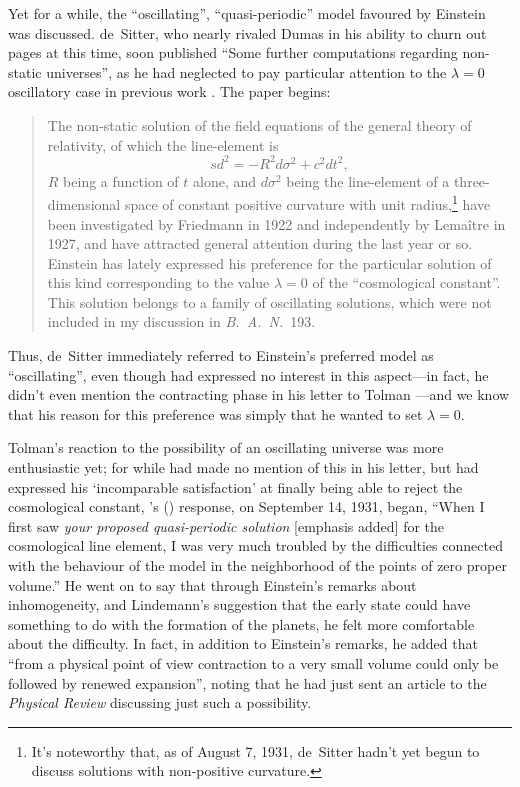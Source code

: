 \documentclass[12 pt]{article}
\def\citeapos#1{\citeauthor{#1}'s (\citeyear{#1})}
\begin{document}
Yet for a while, the ``oscillating'', ``quasi-periodic'' model favoured by Einstein was discussed. de~Sitter, who nearly rivaled Dumas in his ability to churn out pages at this time, soon published ``Some further computations regarding non-static universes'', as he had neglected to pay particular attention to the $\lambda=0$ oscillatory case in previous work \citep{deSitter1931}. The paper begins:
\begin{quotation}
The non-static solution of the field equations of the general theory of relativity, of which the line-element is
\[sd^2=-R^2d\sigma^2+c^2dt^2,\]
$R$ being a function of $t$ alone, and $d\sigma^2$ being the line-element of a three-dimensional space of constant positive curvature with unit radius,\footnote{It's noteworthy that, as of August 7, 1931, de~Sitter hadn't yet begun to discuss solutions with non-positive curvature.}  have been investigated by Friedmann in 1922 and independently by Lema\^{i}tre in 1927, and have attracted general attention during the last year or so. Einstein has lately expressed his preference for the particular solution of this kind corresponding to the value $\lambda=0$ of the ``cosmological constant''. This solution belongs to a family of oscillating solutions, which were not included in my discussion in \textit{B.\ A.\ N.}\ 193.
\end{quotation}
Thus, de~Sitter immediately referred to Einstein's preferred model as ``oscillating'', even though \citet{Einstein1931a} had expressed no interest in this aspect---in fact, he didn't even mention the contracting phase in his letter to Tolman \citep{Einstein1931b}---and we know that his reason for this preference was simply that he wanted to set $\lambda=0$.

Tolman's reaction to the possibility of an oscillating universe was more enthusiastic yet; for while \citet{Einstein1931b} had made no mention of this in his letter, but had expressed his `incomparable satisfaction' at finally being able to reject the cosmological constant, \citeapos{Tolman1931a} response, on September 14, 1931, began, ``When I first saw \textit{your proposed quasi-periodic solution} [emphasis added] for the cosmological line element, I was very much troubled by the difficulties connected with the behaviour of the model in the neighborhood of the points of zero proper volume.'' He went on to say that through Einstein's remarks about inhomogeneity, and Lindemann's suggestion that the early state could have something to do with the formation of the planets, he felt more comfortable about the difficulty. In fact, in addition to Einstein's remarks, he added that ``from a physical point of view contraction to a very small volume could only be followed by renewed expansion'', noting that he had just sent an article to the \textit{Physical Review} discussing just such a possibility.
\end{document}
